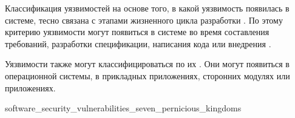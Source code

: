 %
Классификация уязвимостей на основе того, в какой  уязвимость появилась в системе, тесно связана с этапами жизненного цикла разработки . 
%
По этому критерию уязвимости могут появиться в системе во время составления требований, разработки спецификации, написания кода или внедрения  . 

%
Уязвимости также могут классифицироваться по их  . 
%
Они могут появиться в  операционной системы, в прикладных приложениях, сторонних модулях или приложениях. 

	{software_security_vulnerabilities_seven_pernicious_kingdoms}

